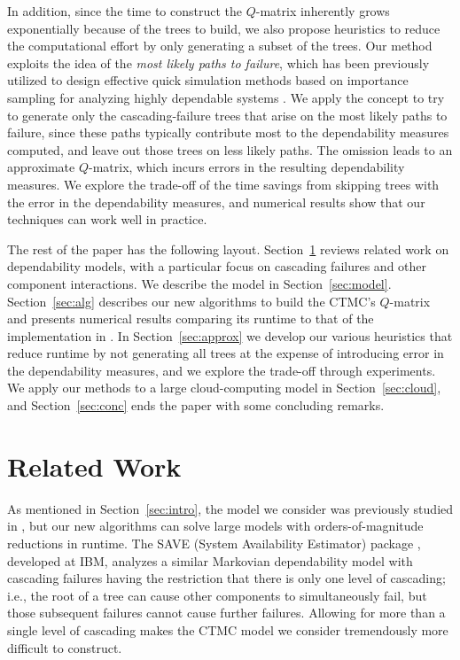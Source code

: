 \documentclass[12pt]{article}
\newcommand{\changed}[1]{#1}
\newcommand{\changed}[1]{\textcolor{red}{#1}}
\begin{document}
In addition, since the time to
construct the $Q$-matrix
inherently grows exponentially
\changed{because of the trees to build},
we also propose heuristics
to reduce the
computational effort by only
generating a subset of the trees.
\changed{Our method exploits
the idea of the
\textit{most likely paths to failure},
which has been previously utilized to
design effective quick simulation methods based
on importance sampling for
analyzing highly dependable systems
\cite{GSHNG:1992,Naka:1996}.
We apply the concept to try to generate only
the cascading-failure trees that arise
on the most likely paths to failure,
since these paths typically contribute most to
the dependability measures computed,
and leave out those trees on less likely paths.}
The omission
leads to an approximate $Q$-matrix,
which incurs errors in
the resulting dependability measures.
We explore the trade-off
of the time savings from
skipping trees
with the error in the dependability
measures,
\changed{and numerical results show
that our techniques can work well in practice.}

The rest of the paper has the
following layout.
Section~\ref{sec:prior} reviews
related work on
dependability models,
with a particular focus
on cascading failures
and other component interactions.
We describe the model
in Section~\ref{sec:model}.
Section~\ref{sec:alg} describes
our new algorithms to build
the CTMC's $Q$-matrix and presents
numerical results comparing its
runtime to that of the implementation
in \cite{ING:2009}.
In Section~\ref{sec:approx}
we develop our various heuristics
that reduce runtime by not
generating all trees at the
expense of introducing error
in the dependability measures,
and we explore the trade-off
through experiments.
We apply our methods to
a large cloud-computing model
in Section~\ref{sec:cloud},
and Section~\ref{sec:conc}
ends the paper with some
concluding remarks.



\section{Related Work}
\label{sec:prior}

As mentioned in Section~\ref{sec:intro},
the model we consider was previously
studied in \cite{ING:2009}, but
our new algorithms can solve large
models with orders-of-magnitude
reductions in runtime.
The SAVE (System Availability Estimator)
package \cite{BHLNS:1994}, developed at IBM,
analyzes a similar Markovian dependability
model with cascading failures
having the restriction that there
is only one level of cascading;
i.e., the root of a tree can
cause other components to simultaneously
fail, but those subsequent failures
cannot cause further failures.
Allowing for more than a
single level of cascading
makes the CTMC model we consider
tremendously more
difficult to construct.
\end{document}
